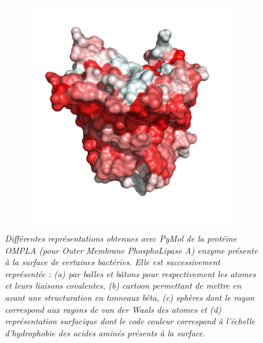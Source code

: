 \begin{figure}
\begin{subfigure}{.5\textwidth}
  \caption{}
    \label{Fig:vdw_representation}
  \end{subfigure}%
  \begin{subfigure}{.5\textwidth}
  \centering
  {\includegraphics[width=\linewidth]{./figures/ch1/surface_representation}}
  \caption{}
    \label{Fig:surface_representation}
  \end{subfigure}%
  \caption[Différentes représentations informatiques de la protéine OMPLA par PyMol.]{\it Différentes représentations obtenues avec PyMol de la protéine OMPLA (pour \textit{Outer Membrane PhosphoLipase A}) enzyme présente à la surface de certaines bactéries. Elle est successivement représentée : (a) par balles et bâtons pour respectivement les atomes et leurs liaisons covalentes, (b) \textit{cartoon} permettant de mettre en avant une structuration en \textit{tonneaux bêta}, (c) sphères dont le rayon correspond aux rayons de van der Waals des atomes et (d) représentation surfacique dont le code couleur correspond à l'échelle d'hydrophobie des acides aminés présents à la surface.
  }
\end{figure}

